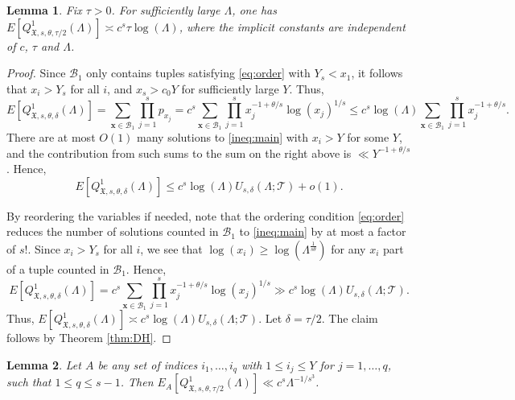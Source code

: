 \documentclass[11pt,reqno]{amsart}
\numberwithin{equation}{section}
\newtheorem{lemma}{Lemma}[section]
\begin{document}
\begin{lemma} \label{lem:largesolns}
Fix $\tau > 0$. For sufficiently large $\Lambda$, one has $E[Q^1_{\mathfrak{X},s,\theta,\tau/2}(\Lambda)] \asymp c^s \tau \log(\Lambda)$, where the implicit constants are independent of $c$, $\tau$ and $\Lambda$. 
\end{lemma}

\begin{proof} Since $\mathcal{B}_1$ only contains tuples satisfying \eqref{eq:order} with $Y_s < x_1$, it follows that $x_i > Y_s$ for all $i$, and $x_s > c_0Y$ for sufficiently large $Y$. Thus, 
\[ E[Q^1_{\mathfrak{X},s,\theta,\delta}(\Lambda)] = \sum_{\mathbf{x} \in \mathcal{B}_1} \prod_{j=1}^s p_{x_j} = c^s \sum_{\mathbf{x} \in \mathcal{B}_1} \prod_{j=1}^s x_j^{-1+\theta/s}\log(x_j)^{1/s} \leq c^s\log(\Lambda) \sum_{\mathbf{x} \in \mathcal{B}_1} \prod_{j=1}^s x_j^{-1+\theta/s}. \]
There are at most $O(1)$ many solutions to \eqref{ineq:main} with $x_i > Y$ for some $Y$, and the contribution from such sums to the sum on the right above is $\ll Y^{-1+\theta/s}$. Hence, 
\[ E[Q^1_{\mathfrak{X},s,\theta,\delta}(\Lambda)] \leq c^s \log(\Lambda) U_{s,\delta}(\Lambda; \mathcal{T}) +o(1). \]

By reordering the variables if needed, note that the ordering condition \eqref{eq:order} reduces the number of solutions counted in $\mathcal{B}_1$ to \eqref{ineq:main} by at most a factor of $s!$. Since $x_i > Y_s$ for all $i$, we see that $\log(x_i) \geq \log(\Lambda^{\frac{1}{s\theta}})$ for any $x_i$ part of a tuple counted in $\mathcal{B}_1$. Hence, 
\[ E[Q^1_{\mathfrak{X},s,\theta,\delta}(\Lambda)] =  c^s \sum_{\mathbf{x} \in \mathcal{B}_1} \prod_{j=1}^s x_j^{-1+\theta/s}\log(x_j)^{1/s} \gg c^s \log(\Lambda) U_{s,\delta}(\Lambda; \mathcal{T}). \]
Thus, $E[Q^1_{\mathfrak{X},s,\theta,\delta}(\Lambda)] \asymp c^s \log(\Lambda) U_{s,\delta}(\Lambda; \mathcal{T})$. Let $\delta = \tau/2$. The claim follows by Theorem \ref{thm:DH}. 
\end{proof}

\begin{lemma} \label{lem:derivsolns}
Let $A$ be any set of indices $i_1,\ldots,i_q$ with $1 \leq i_j \leq Y$ for $j = 1,\ldots,q$, such that $1 \leq q \leq s-1$. Then $E_A[Q^1_{\mathfrak{X},s,\theta,\tau/2}(\Lambda)] \ll c^s \Lambda^{-1/s^3}$. 
\end{lemma}
\end{document}
